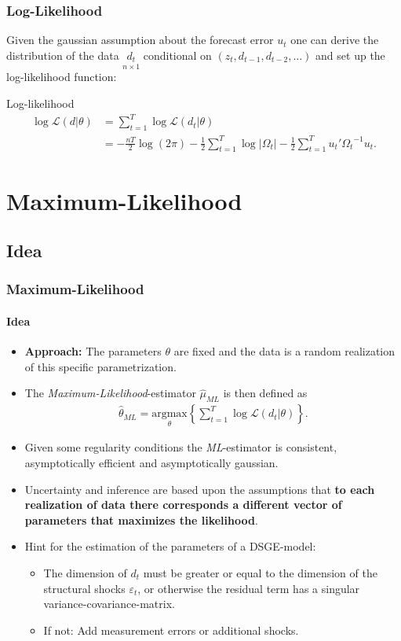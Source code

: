 \documentclass[handout]{beamer}  %
\begin{document}
\begin{frame}\frametitle{Log-Likelihood}
  Given the gaussian assumption about the forecast error ${u_t}$ one can derive the distribution of the data $\underset{n \times 1}{{d_t}}$ conditional on
$({z_t},{d_{t-1}},{d_{t-2}},\dots)$ and set up the log-likelihood function:

\begin{block}{Log-likelihood}
\begin{align*}
\log{ \mathcal{L}({d}|{\theta})} &= \sum_{t=1}^T \log{\mathcal{L}({d_t}|{\theta})}\\ &=-\frac{nT}{2} \log(2\pi) - \frac{1}{2}\sum_{t=1}^{T} \log{|{\Omega_t}|}- \frac{1}{2} \sum_{t=1}^T {u_t}' {\Omega_t}^{-1} {u_t}.
\end{align*}
\end{block}
\end{frame}

\section{Maximum-Likelihood}

\subsection{Idea}
\begin{frame}\frametitle{Maximum-Likelihood}\framesubtitle{Idea}
  \begin{itemize}
    \item \textbf{Approach:} The parameters ${\theta}$ are fixed and the data is a random realization of this specific parametrization.
    \item  The \emph{Maximum-Likelihood}-estimator ${\widehat{\mu}_{ML}}$ is then defined as
    \begin{align*}
    {\widehat{\theta}_{ML}} = \underset{\theta}{\text{argmax}}\left\{ \sum_{t=1}^T \log{\mathcal{L}({d_t}|{\theta})} \right\}.
    \end{align*}
    \item Given some regularity conditions the \emph{ML}-estimator is consistent, asymptotically efficient and asymptotically gaussian.
    \item Uncertainty and inference are based upon the assumptions that \textbf{to each realization of data there corresponds a different vector of parameters that maximizes the likelihood}.
    \item Hint for the estimation of the parameters of a DSGE-model:
    \begin{itemize} \item The dimension of ${d_t}$ must be greater or equal to the dimension of the structural shocks ${\varepsilon_t}$, or otherwise the residual term has a singular variance-covariance-matrix.
    \item If not: Add measurement errors or additional shocks.
  \end{itemize}
  \end{itemize}
\end{frame}
\end{document}
